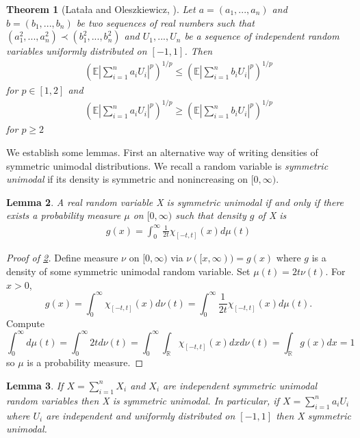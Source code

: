 \documentclass[10pt]{article}
\newcommand{\E}{\mathbb{E}}
\newcommand{\1}{\textbf{1}}
\newcommand{\R}{\mathbb{R}}
\newtheorem{theorem}{Theorem}[subsection]
\newtheorem{lemma}[theorem]{Lemma}
\theoremstyle{remark}
\theoremstyle{definition}
\begin{document}
\begin{theorem}[Lata\l a and Oleszkiewicz, \cite{LO}]\label{thm:URV1}
	Let $a = (a_1,...,a_n)$ and $b=(b_1,...,b_n)$ be two sequences of real numbers such that $(a_1^2,...,a_n^2) \prec (b_1^2,...,b_n^2)$ and $U_1,...,U_n$ be a sequence of independent random variables uniformly distributed on $[-1,1]$. Then
	\begin{align*}
		(\E |\sum_{i=1}^n a_iU_i|^p)^{1/p}\leq (\E |\sum_{i=1}^nb_iU_i|^p)^{1/p}
	\end{align*}
	for $p \in [1,2]$ and
	\begin{align*}
		(\E |\sum_{i=1}^n a_iU_i|^p)^{1/p} \geq (\E |\sum_{i=1}^n b_iU_i|^p)^{1/p}
	\end{align*}
	for $p \geq 2$
\end{theorem}



We establish some lemmas. First an alternative way of writing densities of symmetric unimodal distributions. We recall a random variable is \textit{symmetric unimodal} if its density is symmetric and nonincreasing on $[0,\infty)$. 

\begin{lemma}\label{lem:URV1}
	A real random variable X is symmetric unimodal if and only if there exists a probability measure $\mu$ on $[0,\infty)$ such that density $g$ of X is 
	\begin{align*}
		g(x) = \int_0^{\infty}\frac{1}{2t}\chi_{[-t,t]}(x)d\mu(t)
	\end{align*}
\end{lemma}

\begin{proof}[Proof of \ref{lem:URV1}]
	Define measure $\nu$ on $[0,\infty)$ via $\nu([x,\infty)) = g(x)$ where $g$ is a density of some symmetric unimodal random variable. Set $\mu(t) = 2 t\nu(t)$. For $x > 0$,
	\begin{equation*}
		g(x) = \int_0^{\infty}\chi_{[-t,t]}(x) d\nu(t) = \int_0^{\infty} \frac{1}{2t}\chi_{[-t,t]}(x)d\mu(t).
	\end{equation*}
	Compute
	\begin{equation*}
		\int_0^{\infty}d\mu(t) = \int_0^{\infty} 2td\nu(t) = \int_0^{\infty} \int_{\R} \chi_{[-t,t]}(x)dxd\nu(t) = \int_{\R} g(x) dx = 1
	\end{equation*}
	so $\mu$ is a probability measure.
\end{proof}

\begin{lemma}\label{lem:URV2}
	If $X = \sum_{i=1}^n X_i$ and $X_i$ are independent symmetric unimodal random variables then X is symmetric unimodal. In particular, if $X = \sum_{i=1}^n a_i U_i$ where $U_i$ are independent and uniformly distributed on $[-1,1]$ then X symmetric unimodal. 
\end{lemma}
\end{document}
